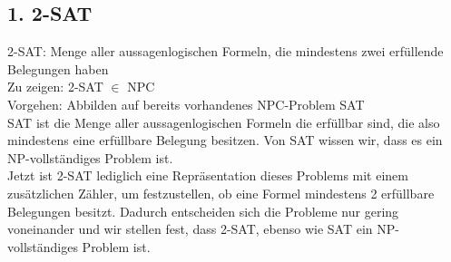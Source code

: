 \subsection*{1. 2-SAT}

2-SAT: Menge aller aussagenlogischen Formeln, die mindestens zwei erfüllende Belegungen haben \\

Zu zeigen: 2-SAT $\in$ NPC \\

Vorgehen: Abbilden auf bereits vorhandenes NPC-Problem SAT \\

SAT ist die Menge aller aussagenlogischen Formeln die erfüllbar sind, die also mindestens eine erfüllbare Belegung besitzen. Von SAT wissen wir, dass es ein NP-vollständiges Problem ist.\\

Jetzt ist 2-SAT lediglich eine Repräsentation dieses Problems mit einem zusätzlichen Zähler, um festzustellen, ob eine Formel mindestens 2 erfüllbare Belegungen besitzt. Dadurch entscheiden sich die Probleme nur gering voneinander und wir stellen fest, dass 2-SAT, ebenso wie SAT ein NP-vollständiges Problem ist.

